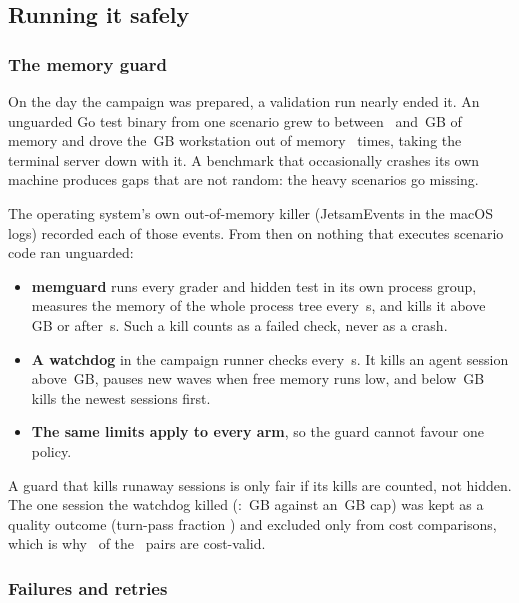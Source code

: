 \subsection{Running it safely}\label{vt:sec:running}

\subsubsection{The memory guard}

On the day the campaign was prepared, a validation run nearly ended it. An unguarded Go test binary from
one scenario grew to between \MemGrowLow\ and \MemGrowHigh\,GB of memory and drove the
\MemMacGB\,GB workstation out of memory \MemTimes\ times, taking the terminal server down with it. A
benchmark that occasionally crashes its own machine produces gaps that are not random: the heavy scenarios
go missing.

The operating system's own out-of-memory killer (JetsamEvents in the macOS logs) recorded each of those events. From then on nothing that executes scenario code ran unguarded:
\begin{itemize}
  \item \textbf{memguard} runs every grader and hidden test in its own process group, measures the memory
    of the whole process tree every \MemPollS\,s, and kills it above \MemGraderGB\,GB or after
    \MemGraderS\,s. Such a kill counts as a failed check, never as a crash.
  \item \textbf{A watchdog} in the campaign runner checks every \MemWatchS\,s. It kills an agent session
    above \KillCap\,GB, pauses new waves when free memory runs low, and below \MemHardFloorGB\,GB kills the
    newest sessions first.
  \item \textbf{The same limits apply to every arm}, so the guard cannot favour one policy.
\end{itemize}

\begin{keyidea}
A guard that kills runaway sessions is only fair if its kills are counted, not hidden. The one session the
watchdog killed (\KillSession: \KillRSS\,GB against an \KillCap\,GB cap) was kept as a quality outcome
(turn-pass fraction \KillTurnPass) and excluded only from cost comparisons, which is why
\NPairsValid\ of the \NPairs\ pairs are cost-valid.
\end{keyidea}

\subsubsection{Failures and retries}

